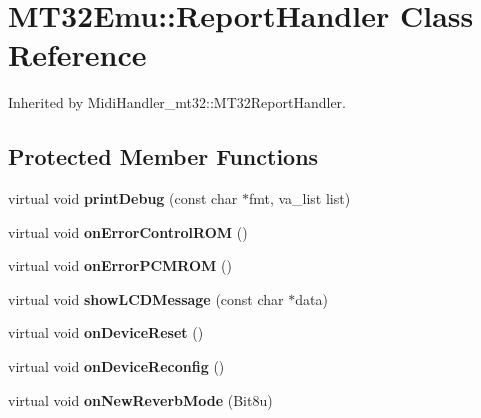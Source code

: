 \hypertarget{classMT32Emu_1_1ReportHandler}{\section{M\-T32\-Emu\-:\-:Report\-Handler Class Reference}
\label{classMT32Emu_1_1ReportHandler}
}


Inherited by Midi\-Handler\-\_\-mt32\-::\-M\-T32\-Report\-Handler.

\subsection*{Protected Member Functions}
\begin{DoxyCompactItemize}
\item 
\hypertarget{classMT32Emu_1_1ReportHandler_a47c45aec4115b841d949b591cf6a2059}{virtual void {\bfseries print\-Debug} (const char $\ast$fmt, va\-\_\-list list)}\label{classMT32Emu_1_1ReportHandler_a47c45aec4115b841d949b591cf6a2059}

\item 
\hypertarget{classMT32Emu_1_1ReportHandler_a736f02f360ccba761eb99e5c6962e29d}{virtual void {\bfseries on\-Error\-Control\-R\-O\-M} ()}\label{classMT32Emu_1_1ReportHandler_a736f02f360ccba761eb99e5c6962e29d}

\item 
\hypertarget{classMT32Emu_1_1ReportHandler_ad1585bd9e1c794d5457364f102c5e969}{virtual void {\bfseries on\-Error\-P\-C\-M\-R\-O\-M} ()}\label{classMT32Emu_1_1ReportHandler_ad1585bd9e1c794d5457364f102c5e969}

\item 
\hypertarget{classMT32Emu_1_1ReportHandler_a797800b213700f64a22e9821e83ecc91}{virtual void {\bfseries show\-L\-C\-D\-Message} (const char $\ast$data)}\label{classMT32Emu_1_1ReportHandler_a797800b213700f64a22e9821e83ecc91}

\item 
\hypertarget{classMT32Emu_1_1ReportHandler_a7aee81bc2b33ddd0c008fbe6d86a43fe}{virtual void {\bfseries on\-Device\-Reset} ()}\label{classMT32Emu_1_1ReportHandler_a7aee81bc2b33ddd0c008fbe6d86a43fe}

\item 
\hypertarget{classMT32Emu_1_1ReportHandler_ac3628ae75ffbd2b30156422484817cd9}{virtual void {\bfseries on\-Device\-Reconfig} ()}\label{classMT32Emu_1_1ReportHandler_ac3628ae75ffbd2b30156422484817cd9}

\item 
\hypertarget{classMT32Emu_1_1ReportHandler_a89577c12c798625fc281fb7d9e28ac56}{virtual void {\bfseries on\-New\-Reverb\-Mode} (Bit8u)}\label{classMT32Emu_1_1ReportHandler_a89577c12c798625fc281fb7d9e28ac56}


\end{DoxyCompactItemize}
